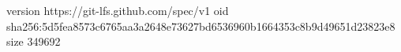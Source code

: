 version https://git-lfs.github.com/spec/v1
oid sha256:5d5fea8573c6765aa3a2648e73627bd6536960b1664353c8b9d49651d23823e8
size 349692
